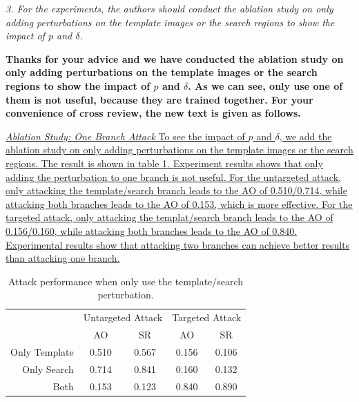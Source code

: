 \documentclass[12pt]{article}
\begin{document}
\textit{3. For the experiments, the authors should conduct the ablation study on only adding perturbations on the template images or the search regions to show the impact of $p$ and $\delta$.}

\textbf{Thanks for your advice and we have conducted the ablation study on only adding perturbations on the template images or the search regions to show the impact of $p$ and $\delta$. As we can see, only use one of them is not useful, because they are trained together. For your convenience of cross review, the new text is given as follows.}

\uline{\textit{Ablation Study: One Branch Attack} To see the impact of $p$ and $\delta$, we add the ablation study on only adding perturbations on the template images or the search regions. The result is shown in table \ref{table:one_branch}. Experiment results shows that only adding the perturbation to one branch is not useful.
For the untargeted attack, only attacking the template/search branch leads to the AO of 0.510/0.714, while attacking both branches leads to the AO of 0.153, which is more effective.
For the targeted attack, only attacking the templat/search branch leads to the AO of 0.156/0.160, while attacking both branches leads to the AO of 0.840. Experimental results show that attacking two branches can achieve better results than attacking one branch.}

\begin{table}[]
  \centering
  \caption{Attack performance when only use the template/search perturbation.}
  \label{table:one_branch}
  \begin{tabular}{@{}rcccc@{}}
  \toprule
                & \multicolumn{2}{c}{Untargeted Attack} & \multicolumn{2}{c}{Targeted Attack} \\
                & AO                & SR                & AO               & SR               \\ \midrule
  Only Template & 0.510             & 0.567             & 0.156            & 0.106            \\
  Only Search   & 0.714             & 0.841             & 0.160            & 0.132            \\
  Both          & 0.153             & 0.123             & 0.840            & 0.890            \\
  \bottomrule
  \end{tabular}
\end{table}
\end{document}
